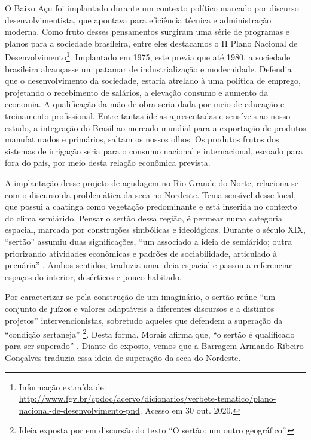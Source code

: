 \begin{refsection}
    O Baixo Açu foi implantado durante um contexto político marcado por discurso desenvolvimentista, que apontava para eficiência técnica e administração moderna.  Como fruto desses pensamentos surgiram uma série de programas e planos para a sociedade brasileira, entre eles destacamos o II Plano Nacional de Desenvolvimento\footnote{Informação extraída de: \url{http://www.fgv.br/cpdoc/acervo/dicionarios/verbete-tematico/plano-nacional-de-desenvolvimento-pnd}. Acesso em 30 out. 2020.}. Implantado em 1975, este previa que até 1980, a sociedade brasileira alcançasse um patamar de industrialização e modernidade. Defendia que o desenvolvimento da sociedade, estaria atrelado à uma política de emprego, projetando o recebimento de salários, a elevação consumo e aumento da economia. A qualificação da mão de obra seria dada por meio de educação e treinamento profissional. Entre tantas ideias apresentadas e sensíveis ao nosso estudo, a integração do Brasil ao mercado mundial para a exportação de produtos manufaturados e primários, saltam os nossos olhos. Os produtos frutos dos sistemas de irrigação seria para o consumo nacional e internacional, escoado para fora do país, por meio desta relação econômica prevista. 

    A implantação desse projeto de açudagem no Rio Grande do Norte, re\-la\-ci\-o\-na-se com o discurso da problemática da seca no Nordeste. Tema sensível desse local, que possui a caatinga como vegetação predominante e está inserida no contexto do clima semiárido. Pensar o sertão dessa região, é permear numa categoria espacial, marcada por construções simbólicas e ideológicas. Durante o século XIX, ``sertão'' assumiu duas significações, ``um associado a ideia de semiárido; outra priorizando atividades econômicas e padrões de sociabilidade, articulado à pecuária'' \cite[p.~155--156]{Neves2003Sertao}. Ambos sentidos, traduzia uma ideia espacial e passou a referenciar espaços do interior, desérticos e pouco habitado.  

    Por caracterizar-se pela construção de um imaginário, o sertão reúne ``um conjunto de juízos e valores adaptáveis a diferentes discursos e a distintos projetos'' \cite[p.~3]{Moraes2003Sertao} intervencionistas, sobretudo aqueles que defendem a superação da ``condição sertaneja'' \footnote{Ideia exposta por \textcite{Moraes2003Sertao} em discursão do texto ``O sertão: um outro geográfico''.}. Desta forma, Morais afirma que, ``o sertão é qualificado para ser superado'' \cite[p.~4]{Moraes2003Sertao}. Diante do exposto, vemos que a Barragem Armando Ribeiro Gonçalves traduzia essa ideia de superação da seca do Nordeste. 


\end{refsection}

